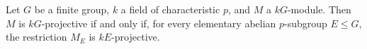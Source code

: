 Let $G$ be a finite group, $k$ a field of characteristic $p$, and $M$ a $kG$-module. Then $M$ is $kG$-projective if and only if, for every elementary abelian $p$-subgroup $E \leq G$, the restriction $M_E$ is $kE$-projective.

